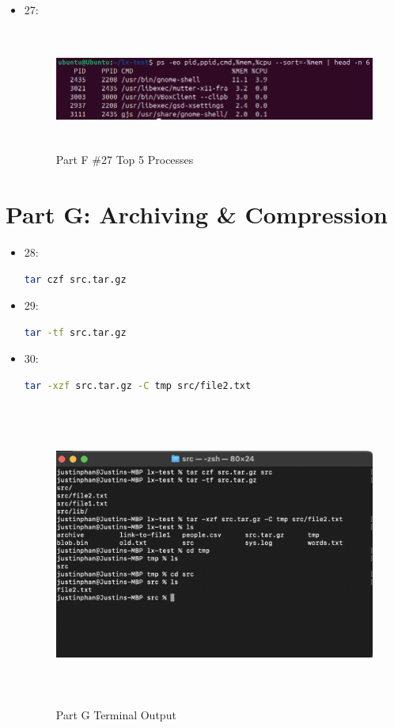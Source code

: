 \begin{itemize}
    \item 27: 
     \begin{figure}[H]
        \centering
        \includegraphics[width=15cm, height=4cm]{png/LinuxProblemSetPicsPNG/PartF27.png}
        \caption{Part F \#27 Top 5 Processes}
        \label{fig:partF 27}
    \end{figure}
\end{itemize}

\section{Part G: Archiving \& Compression}
\begin{itemize}
    \item 28: 
    \begin{lstlisting}[language=Bash]
        tar czf src.tar.gz
    \end{lstlisting}
    \item 29: 
    \begin{lstlisting}[language=Bash]
        tar -tf src.tar.gz
    \end{lstlisting}
    \item 30: 
    \begin{lstlisting}[language=Bash]
        tar -xzf src.tar.gz -C tmp src/file2.txt
    \end{lstlisting}
    \begin{figure}[htp]
    \centering
    \includegraphics[width=15cm, height=10cm]{png/LinuxProblemSetPicsPNG/part_g.png}
    \caption{Part G Terminal Output}
    \label{fig:part G}
\end{figure}
\end{itemize}

